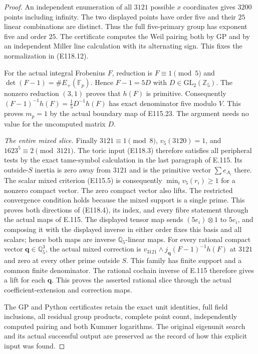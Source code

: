 \begin{proof}
An independent enumeration of all $3121$ possible
$x$ coordinates gives $3200$ points including infinity.
The two displayed points have order five and their
$25$ linear combinations are distinct. Thus the full
five-primary group has exponent five and order $25$.
The certificate computes the Weil pairing both by GP
and by an independent Miller line calculation with its
alternating sign. This fixes the normalization in
(E118.12).

For the actual integral Frobenius $F$, reduction is
$F\equiv1\pmod5$ and $\det(F-1)=\#E_+(\mathbb F_p)$.
Hence $F-1=5D$ with $D\in\mathrm{GL}_2(\mathbb Z_5)$.
The nonzero reduction $(3,1)$ proves that
$h(F)$ is primitive. Consequently
$(F-1)^{-1}h(F)=\tfrac15D^{-1}h(F)$ has exact denominator
five modulo $V$. This proves $m_p=1$ by the actual
boundary map of E115.23. The argument needs no value
for the uncomputed matrix $D$.

\emph{The entire mixed slice.}
Finally $3121\equiv1\pmod8$, $v_5(3120)=1$, and
$1623^5\equiv2\pmod{3121}$. The toric input (E118.3)
therefore satisfies all peripheral tests by the exact
tame-symbol calculation in the last paragraph of E.115.
Its outside-$S$ inertia is zero away from $3121$ and
is the primitive vector $\sum e_{A_i}$ there.
The scalar mixed criterion (E115.5) is consequently
$\min_i v_5(r_i)\ge1$ for a nonzero compact vector.
The zero compact vector also lifts. The restricted
convergence condition holds because the mixed support
is a single prime. This proves both directions of
(E118.4), its index, and every fibre statement through
the actual maps of E.115. The displayed tensor map sends
$(5e_i)\otimes1$ to $5e_i$, and composing it with the
displayed inverse in either order fixes this basis and all
scalars; hence both maps are inverse $\mathbb Q_5$-linear maps.
For every rational compact vector $\mathbf q\in\mathbb Q_5^3$,
the actual mixed correction is
$v_{3121}\wedge j_{\mathbf q}(F-1)^{-1}h(F)$ at $3121$
and zero at every other prime outside $S$. This family
has finite support and a common finite denominator. The
rational cochain inverse of E.115 therefore gives a lift for
each $\mathbf q$. This proves the asserted rational slice
through the actual coefficient-extension and correction maps.

The GP and Python certificates retain the exact unit
identities, full field inclusions, all residual group
products, complete point count, independently computed
pairing and both Kummer logarithms. The original
eigenunit search and its actual successful output are
preserved as the record of how this explicit input was found.
\end{proof}
